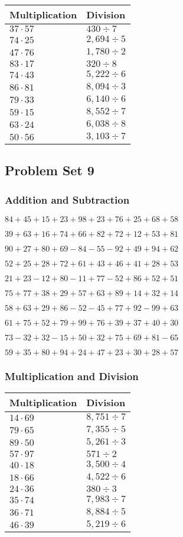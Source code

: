 \begin{longtable}[]{@{}ll@{}}
\toprule
Multiplication & Division\tabularnewline
\midrule
\endhead
\(37\cdot57\) & \(430÷7\)\tabularnewline
\(74\cdot25\) & \(2,694÷5\)\tabularnewline
\(47\cdot76\) & \(1,780÷2\)\tabularnewline
\(83\cdot17\) & \(320÷8\)\tabularnewline
\(74\cdot43\) & \(5,222÷6\)\tabularnewline
\(86\cdot81\) & \(8,094÷3\)\tabularnewline
\(79\cdot33\) & \(6,140÷6\)\tabularnewline
\(59\cdot15\) & \(8,552÷7\)\tabularnewline
\(63\cdot24\) & \(6,038÷8\)\tabularnewline
\(50\cdot56\) & \(3,103÷7\)\tabularnewline
\bottomrule
\end{longtable}

\hypertarget{problem-set-9-1}{%
\subsection{Problem Set 9}\label{problem-set-9-1}}

\hypertarget{addition-and-subtraction-49}{%
\subsubsection{Addition and
Subtraction}\label{addition-and-subtraction-49}}

\(84+45+15+23+98+23+76+25+68+ 58\)

\(39+63+16+74+66+82+72+12+53+81\)

\(90+27+80+69-84-55-92+49+94+62\)

\(52+25+28+72+61+43+46+41+28+53\)

\(21+23-12+80-11+77-52+86+52+51\)

\(75+77+38+29+57+63+89+14+32+14\)

\(58+63+29+86-52-45+77+92-99+63\)

\(61+75+52+79+99+76+39+37+40+30\)

\(73-32+32-15+50+32+75+69+81-65\)

\(59+35+80+94+24+47+23+30+28+57\)

\hypertarget{multiplication-and-division-49}{%
\subsubsection{Multiplication and
Division}\label{multiplication-and-division-49}}

\begin{longtable}[]{@{}ll@{}}
\toprule
Multiplication & Division\tabularnewline
\midrule
\endhead
\(14\cdot69\) & \(8,751÷7\)\tabularnewline
\(79\cdot65\) & \(7,355÷5\)\tabularnewline
\(89\cdot50\) & \(5,261÷3\)\tabularnewline
\(57\cdot97\) & \(571÷2\)\tabularnewline
\(40\cdot18\) & \(3,500÷4\)\tabularnewline
\(18\cdot66\) & \(4,522÷6\)\tabularnewline
\(24\cdot36\) & \(380÷3\)\tabularnewline
\(35\cdot74\) & \(7,983÷7\)\tabularnewline
\(36\cdot71\) & \(8,884÷5\)\tabularnewline
\(46\cdot39\) & \(5,219 ÷6\)\tabularnewline
\bottomrule
\end{longtable}

